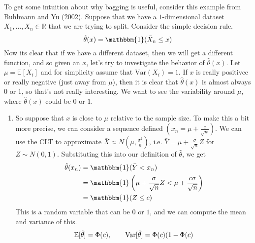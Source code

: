   \begin{example}
    To get some intuition about why bagging is useful, consider this example from Buhlmann and Yu (2002). Suppose that we have a $1$-dimensional dataset $X_1, \ldots, X_n \in \mathbb{R}$ that we are trying to split. Consider the simple decision rule. 
    \begin{equation}
      \hat{\theta} (x) = \mathbbm{1}(\bar{X}_n \leq x)
    \end{equation}
    Now its clear that if we have a different dataset, then we will get a different function, and so given an $x$, let's try to investigate the behavior of $\hat{\theta}(x)$. Let $\mu = \mathbb{E}[X_i]$ and for simplicity assume that $\text{Var}(X_i) = 1$. If $x$ is really positivce or really negative (just away from $\mu$), then it is clear that $\hat{\theta}(x)$ is almost always $0$ or $1$, so that's not really interesting. We want to see the variability around $\mu$, where $\hat{\theta}(x)$ could be $0$ or $1$. 
    \begin{enumerate}
      \item So suppose that $x$ is close to $\mu$ relative to the sample size. To make this a bit more precise, we can consider a sequence defined $(x_n = \mu + \frac{c}{\sqrt{n}})$. We can use the CLT to approximate $\bar{X} \approx N(\mu, \frac{\sigma^2}{n})$, i.e. $\bar{Y} = \mu + \frac{\sigma}{\sqrt{n}} Z$ for $Z \sim N(0, 1)$. Substituting this into our definition of $\hat{\theta}$, we get 
      \begin{align}
        \hat{\theta}(x_n) & = \mathbbm{1}(\bar{Y} < x_n) \\ 
                          & = \mathbbm{1} \left( \mu + \frac{\sigma}{\sqrt{n}} Z < \mu + \frac{c \sigma}{\sqrt{n}} \right) \\ 
                          & = \mathbbm{1}(Z \leq c)
      \end{align}
      This is a random variable that can be $0$ or $1$, and we can compute the mean and variance of this. 
      \begin{equation}
        \mathbb{E}[\hat{\theta}] = \Phi(c), \qquad \operatorname{Var}[\hat{\theta}] = \Phi(c) (1 - \Phi(c)
      \end{equation}


\end{enumerate}
\end{example}
